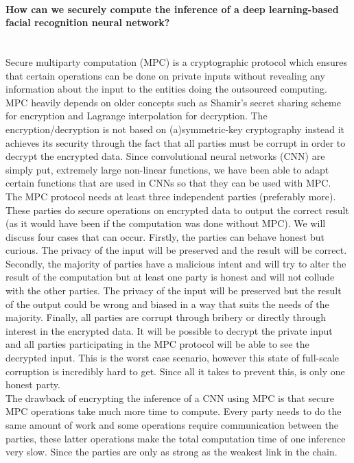 \paragraph{How can we securely compute the inference of a deep learning-based facial recognition neural network?}\mbox{} \\
Secure multiparty computation (MPC) is a cryptographic protocol which ensures that certain operations can be done on private inputs without revealing any information about the input to the entities doing the outsourced computing. MPC heavily depends on older concepts such as Shamir's secret sharing scheme for encryption and Lagrange interpolation for decryption. The encryption/decryption is not based on (a)symmetric-key cryptography instead it achieves its security through the fact that all parties must be corrupt in order to decrypt the encrypted data. Since convolutional neural networks (CNN) are simply put, extremely large non-linear functions, we have been able to adapt certain functions that are used in CNNs so that they can be used with MPC.\\
The MPC protocol needs at least three independent parties (preferably more). These parties do secure operations on encrypted data to output the correct result (as it would have been if the computation was done without MPC). We will discuss four cases that can occur. Firstly, the parties can behave honest but curious. The privacy of the input will be preserved and the result will be correct. Secondly, the majority of parties have a malicious intent and will try to alter the result of the computation but at least one party is honest and will not collude with the other parties. The privacy of the input will be preserved but the result of the output could be wrong and biased in a way that suits the needs of the majority. Finally, all parties are corrupt through bribery or directly through interest in the encrypted data. It will be possible to decrypt the private input and all parties participating in the MPC protocol will be able to see the decrypted input. This is the worst case scenario, however this state of full-scale corruption is incredibly hard to get. Since all it takes to prevent this, is only one honest party.\\
The drawback of encrypting the inference of a CNN using MPC is that secure MPC operations take much more time to compute. Every party needs to do the same amount of work and some operations require communication between the parties, these latter operations make the total computation time of one inference very slow. Since the parties are only as strong as the weakest link in the chain.

